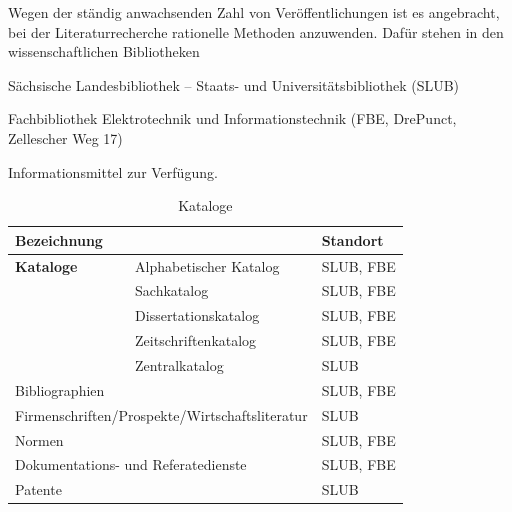 Wegen der ständig anwachsenden Zahl von Veröffentlichungen ist es angebracht, bei der Literaturrecherche rationelle Methoden anzuwenden.
Dafür stehen in den wissenschaftlichen Bibliotheken
\begin{compactitem}
  \item Sächsische Landesbibliothek -- Staats- und Universitätsbibliothek (SLUB)
  \item Fachbibliothek Elektrotechnik und Informationstechnik (FBE, DrePunct, Zellescher Weg 17)
\end{compactitem}
Informationsmittel zur Verfügung.

\begin{table}[h]
  \centering
  \caption{Kataloge}
  \label{tab:Kataloge}
  \begin{tabular}{lll}%
    \toprule
    Bezeichnung     &                                                   & Standort  \\
    \midrule
    {\bfseries Kataloge}  & Alphabetischer Katalog                      & SLUB, FBE \\
                    & Sachkatalog                                       & SLUB, FBE \\
                    & Dissertationskatalog                              & SLUB, FBE \\
                    & Zeitschriftenkatalog                              & SLUB, FBE \\
                    & Zentralkatalog                                    & SLUB      \\
    \multicolumn{2}{l}{Bibliographien}                                  & SLUB, FBE \\
    \multicolumn{2}{l}{Firmenschriften/Prospekte/Wirtschaftsliteratur}  & SLUB      \\
    \multicolumn{2}{l}{Normen}                                          & SLUB, FBE \\
    \multicolumn{2}{l}{Dokumentations- und Referatedienste}             & SLUB, FBE \\
    \multicolumn{2}{l}{Patente}                                         & SLUB\\
    \bottomrule
  \end{tabular}
\end{table}

